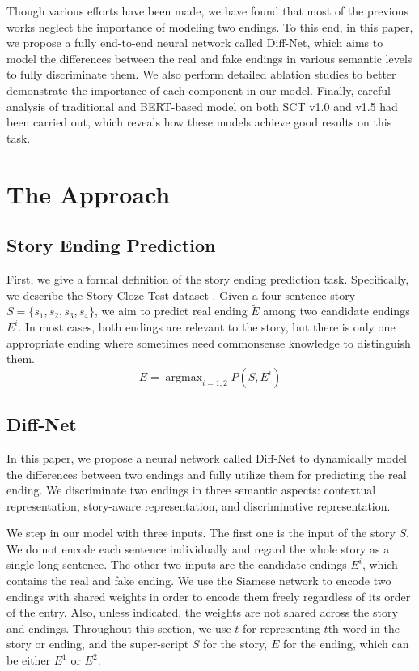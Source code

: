 \documentclass[letterpaper]{article} %
\begin{document}
Though various efforts have been made, we have found that most of the previous works neglect the importance of modeling two endings.
To this end, in this paper, we propose a fully end-to-end neural network called Diff-Net, which aims to model the differences between the real and fake endings in various semantic levels to fully discriminate them.
We also perform detailed ablation studies to better demonstrate the importance of each component in our model.
Finally, careful analysis of traditional and BERT-based model on both SCT v1.0 and v1.5 had been carried out, which reveals how these models achieve good results on this task.



\section{The Approach}\label{diffnet}
\subsection{Story Ending Prediction}
First, we give a formal definition of the story ending prediction task.
Specifically, we describe the Story Cloze Test dataset \cite{mostafazadeh-etal-2016}.
Given a four-sentence story $S=\{s_1, s_2, s_3, s_4\}$, we aim to predict real ending $\widetilde{E}$ among two candidate endings $E^i$.
In most cases, both endings are relevant to the story, but there is only one appropriate ending where sometimes need commonsense knowledge to distinguish them.
\begin{equation}
\widetilde{E} = \mathop{\arg\max}_{i=1,2}P(S, E^i)
\end{equation}

\subsection{Diff-Net}
In this paper, we propose a neural network called Diff-Net to dynamically model the differences between two endings and fully utilize them for predicting the real ending.
We discriminate two endings in three semantic aspects: contextual representation, story-aware representation, and discriminative representation.

We step in our model with three inputs.
The first one is the input of the story $S$. We do not encode each sentence individually and regard the whole story as a single long sentence.
The other two inputs are the candidate endings $E^i$, which contains the real and fake ending.
We use the Siamese network \cite{chopra-etal-2005} to encode two endings with shared weights in order to encode them freely regardless of its order of the entry.
Also, unless indicated, the weights are not shared across the story and endings.
Throughout this section, we use $t$ for representing $t$th word in the story or ending, and the super-script $S$ for the story, $E$ for the ending, which can be either $E^1$ or $E^2$.
\end{document}
